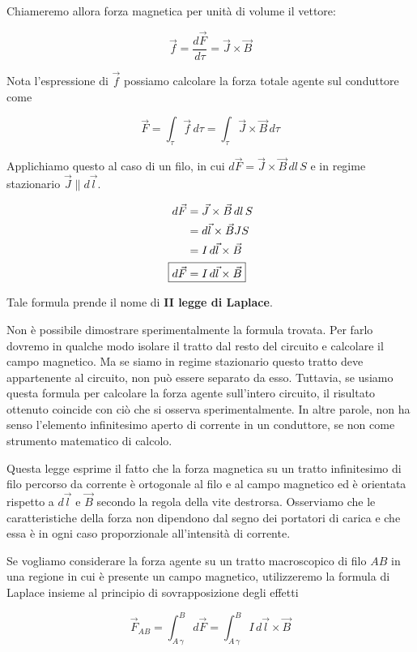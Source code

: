 Chiameremo allora forza magnetica per unità di volume il vettore:

\[
	\vec{f} = \frac{d\vec{F}}{d\tau}= \vec{J} \times \vec{B}
\]

Nota l'espressione di $\vec{f}$ possiamo calcolare la forza totale agente sul conduttore come

\[
	\vec{F} =\int_{\tau} \vec{f} \, d\tau = \int_{\tau}\vec{J} \times \vec{B} \,d\tau
\]

Applichiamo questo al caso di un filo, in cui $ d\vec{F} =\vec{J} \times \vec{B} \,dl\,S $ e in regime stazionario $ \vec{J} \parallel d\vec{l}$.

\begin{align*}
	d\vec{F} &=\vec{J} \times \vec{B} \,dl\,S \\
	&= d\vec{l} \times \vec{B} JS\\
	&= I\,d\vec{l} \times \vec{B}\\
	\Aboxed{d\vec{F}&= I\,d\vec{l} \times \vec{B}}
\end{align*}

Tale formula prende il nome di \textbf{II legge di Laplace}.

Non è possibile dimostrare sperimentalmente la formula trovata. Per farlo dovremo in qualche modo isolare il tratto dal resto del circuito e calcolare il campo magnetico. Ma se siamo in regime stazionario questo tratto deve appartenente al circuito, non può essere separato da esso. Tuttavia, se usiamo questa formula per calcolare la forza agente sull'intero circuito, il risultato ottenuto coincide con ciò che si osserva sperimentalmente. In altre parole, non ha senso l'elemento infinitesimo aperto di corrente in un conduttore, se non come strumento matematico di calcolo.

Questa legge esprime il fatto che la forza magnetica su un tratto infinitesimo di filo percorso da corrente è ortogonale al filo e al campo magnetico ed è orientata rispetto a $ d\vec{l}$ e $ \vec{B}$ secondo la regola della vite destrorsa. Osserviamo che le caratteristiche della forza non dipendono dal segno dei portatori di carica e che essa è in ogni caso proporzionale all'intensità di corrente.

Se vogliamo considerare la forza agente su un tratto macroscopico di filo $ AB $ in una regione in cui è presente un campo magnetico, utilizzeremo la formula di Laplace insieme al principio di sovrapposizione degli effetti

\[
	\vec{F}_{AB}=\int_{A\,\gamma}^B d\vec{F} = \int_{A\,\gamma}^B I\,d\vec{l} \times \vec{B}
\]

